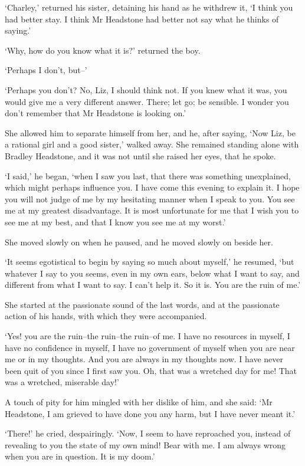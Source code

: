 ‘Charley,’ returned his sister, detaining his hand as he withdrew it, ‘I
think you had better stay. I think Mr Headstone had better not say what
he thinks of saying.’

‘Why, how do you know what it is?’ returned the boy.

‘Perhaps I don’t, but--’

‘Perhaps you don’t? No, Liz, I should think not. If you knew what
it was, you would give me a very different answer. There; let go; be
sensible. I wonder you don’t remember that Mr Headstone is looking on.’

She allowed him to separate himself from her, and he, after saying, ‘Now
Liz, be a rational girl and a good sister,’ walked away. She remained
standing alone with Bradley Headstone, and it was not until she raised
her eyes, that he spoke.

‘I said,’ he began, ‘when I saw you last, that there was something
unexplained, which might perhaps influence you. I have come this evening
to explain it. I hope you will not judge of me by my hesitating manner
when I speak to you. You see me at my greatest disadvantage. It is most
unfortunate for me that I wish you to see me at my best, and that I know
you see me at my worst.’

She moved slowly on when he paused, and he moved slowly on beside her.

‘It seems egotistical to begin by saying so much about myself,’ he
resumed, ‘but whatever I say to you seems, even in my own ears, below
what I want to say, and different from what I want to say. I can’t help
it. So it is. You are the ruin of me.’

She started at the passionate sound of the last words, and at the
passionate action of his hands, with which they were accompanied.

‘Yes! you are the ruin--the ruin--the ruin--of me. I have no resources
in myself, I have no confidence in myself, I have no government of
myself when you are near me or in my thoughts. And you are always in my
thoughts now. I have never been quit of you since I first saw you. Oh,
that was a wretched day for me! That was a wretched, miserable day!’

A touch of pity for him mingled with her dislike of him, and she said:
‘Mr Headstone, I am grieved to have done you any harm, but I have never
meant it.’

‘There!’ he cried, despairingly. ‘Now, I seem to have reproached you,
instead of revealing to you the state of my own mind! Bear with me. I am
always wrong when you are in question. It is my doom.’

